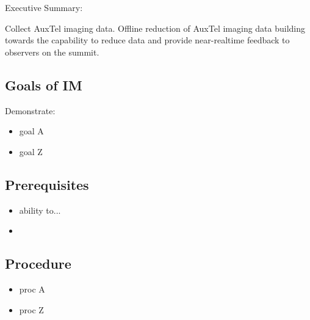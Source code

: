 
Executive Summary:

Collect AuxTel imaging data. Offline reduction of AuxTel imaging data building towards the capability to reduce data and provide near-realtime feedback to observers on the summit.

\subsection{Goals of IM}
Demonstrate:
\begin{itemize}
\item goal A
\item goal Z
\end{itemize}

\subsection{Prerequisites}
\begin{itemize}
\item ability to...
\item {}
\end{itemize}

\subsection{Procedure}
\begin{itemize}
\item proc A
\item proc Z
\end{itemize}
